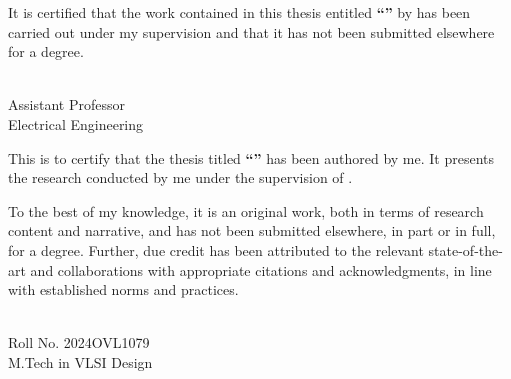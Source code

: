\documentclass[11pt, a4paper, oneside]{Thesis} %
\begin{document}

\setcounter{page}{2}

\begin{minipage}{\textwidth}
    
    It is certified that the work contained in this thesis entitled \textbf{\enquote{\ttitle}} by \textbf{\authornames} has been carried out under my supervision and that it has not been submitted elsewhere for a degree.
        
\end{minipage}

\vspace{20.00mm}

\begin{minipage}{0.49\textwidth}
		\begin{flushleft}
			{\supnameA\\
			  Assistant Professor\\
            Electrical Engineering\\
			\univname}
		\end{flushleft}
\end{minipage}
\vfill
\clearpage %

This is to certify that the thesis titled \textbf{``\ttitle''} has been authored by me. It presents the research conducted by me under the supervision of \textbf{\supnameA}.\par

To the best of my knowledge, it is an original work, both in terms of research content and narrative, and has not been submitted elsewhere, in part or in full, for a degree. Further, due credit has been attributed to the relevant state-of-the-art and collaborations with appropriate citations and acknowledgments, in line with established norms and practices.\\ [2cm]
\begin{minipage}{.5\textwidth}
		\begin{flushleft}
			{\authornames\\ Roll No. 2024OVL1079 \\
			M.Tech in VLSI Design \\
			\univname}
		\end{flushleft}
\end{minipage}
\vfill
\end{document}
